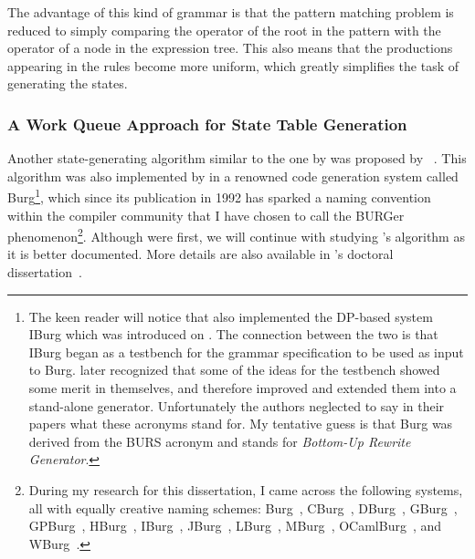 {The advantage of this kind of \gls{grammar} is that the \gls{pattern matching}
problem is reduced to simply comparing the operator of the \gls{root} in the
\gls{pattern} with the operator of a \gls{node} in the \gls{expression tree}.
%
This
also means that the \glspl{production} appearing in the \glspl{rule} become more
uniform, which greatly simplifies the task of generating the \glspl{state}.


\subsubsection{A Work Queue Approach for State Table Generation}

Another \gls{state}-generating algorithm similar to the one by
\citeauthor{Balachandran1990} was proposed by
\citeauthor{Proebsting1992b}~\cite{Proebsting1992b, Proebsting1995a}.
%
This
algorithm was also implemented by \textcite{Fraser1992b} in a renowned \gls{code
  generation} system called \gls{Burg}\footnote{The keen reader will notice that
  \citeauthor{Fraser1992a} also implemented the \gls{DP}-based system
  \gls{IBurg} which was introduced on .
%
The connection between
  the two is that \gls{IBurg} began as a testbench for the \gls{grammar}
  specification to be used as input to \gls{Burg}.
%
\citeauthor{Fraser1992b}
  later recognized that some of the ideas for the testbench showed some merit in
  themselves, and therefore improved and extended them into a stand-alone
  generator.
%
Unfortunately the authors neglected to say in their papers what
  these acronyms stand for.
%
My tentative guess is that \gls{Burg} was derived from the \gls{BURS} acronym
and stands for \emph{Bottom-Up Rewrite Generator}.}, which since its
publication in 1992 has sparked a naming convention within the \gls{compiler}
community that I have chosen to call the \gls{BURGer phenomenon}\footnote{During
  my research for this dissertation, I came across the following systems, all
  with equally creative naming schemes: \gls{Burg}~\cite{Fraser1992b},
  \gls{CBurg}~\cite{Scharwaechter2007}, \gls{DBurg}~\cite{Ertl1999},
  \gls{GBurg}~\cite{Fraser1999}, \gls{GPBurg}~\cite{Gough2012},
  \gls{HBurg}~\cite{HBURG}, \gls{IBurg}~\cite{Fraser1992a},
  \gls{JBurg}~\cite{JBURG}, \gls{LBurg}~\cite{Hanson1995},
  \gls{MBurg}~\cite{Gough1995, Gough1997}, \gls{OCamlBurg}~\cite{OCamlBURG}, and
  \gls{WBurg}~\cite{Proebsting1996}.}.  Although \citeauthor{Balachandran1990}
were first, we will continue with studying \citeauthor{Proebsting1992b}'s
algorithm as it is better documented.
%
More details are also available in \citeauthor{Proebsting1992a}'s
doctoral dissertation~\cite{Proebsting1992a}.

}
